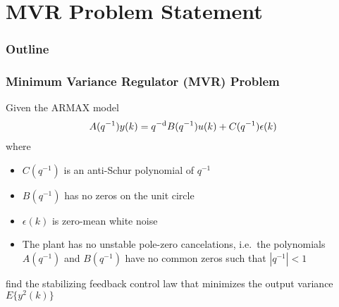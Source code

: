 \section{MVR Problem Statement}
\begin{frame}
    \frametitle{Outline}
    \tableofcontents[currentsection]
\end{frame}

\begin{frame}
    \frametitle{Minimum Variance Regulator (MVR) Problem}

    Given the ARMAX model
    \begin{align*}
        A(q^{-1}) y(k) = q^{-\textrm{d}} B(q^{-1}) u(k) + C(q^{-1}) \epsilon(k)
    \end{align*}
    where
    \begin{itemize}
        \item
        $C(q^{-1})$ is an anti-Schur polynomial of $q^{-1}$

        \item
        $B(q^{-1})$ has no zeros on the unit circle

        \item
        $\epsilon(k)$ is zero-mean white noise
        
        \item
        The plant has no unstable pole-zero cancelations, i.e.\ the polynomials $A(q^{-1})$ and $B(q^{-1})$ have no common zeros such that $|q^{-1}| < 1$
    \end{itemize}
    \pause
    
    find the stabilizing feedback control law that minimizes the output variance $E\{y^2(k)\}$
\end{frame}
